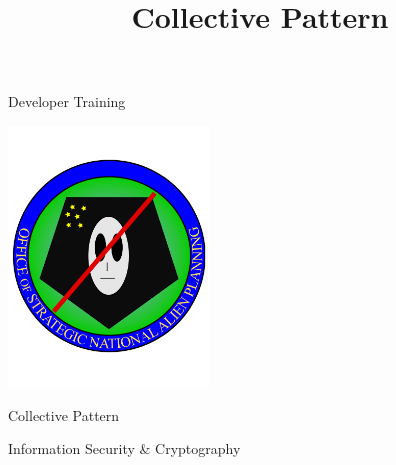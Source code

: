 \documentclass[xcolor=dvipsnames]{beamer}
\begin{document}
	\title[Collective Pattern]{Collective Pattern}
	\author[]{\className}
	\institute[\className]{\departmentName}
	\date{} 


	\begin{frame}
		\maketitle
	\end{frame}
	
	\begin{frame}{Developer Training}
		\begin{center}
			\includegraphics[width=0.4\textwidth]{images/OSNAP_logo} 
			
			Collective Pattern
			
			Information Security \& Cryptography
		\end{center}
	\end{frame}
	
\end{document}
